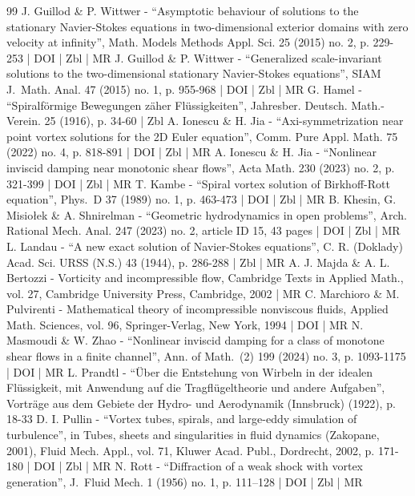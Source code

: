\begin{thebibliography}{99}
J. Guillod \& P. Wittwer - “Asymptotic behaviour of solutions to the stationary Navier-Stokes equations in two-dimensional exterior domains with zero velocity at infinity”, Math. Models Methods Appl. Sci. 25 (2015) no. 2, p. 229-253 | DOI | Zbl | MR
J. Guillod \& P. Wittwer - “Generalized scale-invariant solutions to the two-dimensional stationary Navier-Stokes equations”, SIAM J. Math. Anal. 47 (2015) no. 1, p. 955-968 | DOI | Zbl | MR
G. Hamel - “Spiralförmige Bewegungen zäher Flüssigkeiten”, Jahresber. Deutsch. Math.-Verein. 25 (1916), p. 34-60 | Zbl
A. Ionescu \& H. Jia - “Axi-symmetrization near point vortex solutions for the 2D Euler equation”, Comm. Pure Appl. Math. 75 (2022) no. 4, p. 818-891 | DOI | Zbl | MR
A. Ionescu \& H. Jia - “Nonlinear inviscid damping near monotonic shear flows”, Acta Math. 230 (2023) no. 2, p. 321-399 | DOI | Zbl | MR
T. Kambe - “Spiral vortex solution of Birkhoff-Rott equation”, Phys. D 37 (1989) no. 1, p. 463-473 | DOI | Zbl | MR
B. Khesin, G. Misiołek \& A. Shnirelman - “Geometric hydrodynamics in open problems”, Arch. Rational Mech. Anal. 247 (2023) no. 2, article ID 15, 43 pages | DOI | Zbl | MR
L. Landau - “A new exact solution of Navier-Stokes equations”, C. R. (Doklady) Acad. Sci. URSS (N.S.) 43 (1944), p. 286-288 | Zbl | MR
A. J. Majda \& A. L. Bertozzi - Vorticity and incompressible flow, Cambridge Texts in Applied Math., vol. 27, Cambridge University Press, Cambridge, 2002 | MR
C. Marchioro \& M. Pulvirenti - Mathematical theory of incompressible nonviscous fluids, Applied Math. Sciences, vol. 96, Springer-Verlag, New York, 1994 | DOI | MR
N. Masmoudi \& W. Zhao - “Nonlinear inviscid damping for a class of monotone shear flows in a finite channel”, Ann. of Math. (2) 199 (2024) no. 3, p. 1093-1175 | DOI | MR
L. Prandtl - “Über die Entstehung von Wirbeln in der idealen Flüssigkeit, mit Anwendung auf die Tragflügeltheorie und andere Aufgaben”, Vorträge aus dem Gebiete der Hydro- und Aerodynamik (Innsbruck) (1922), p. 18-33
D. I. Pullin - “Vortex tubes, spirals, and large-eddy simulation of turbulence”, in Tubes, sheets and singularities in fluid dynamics (Zakopane, 2001), Fluid Mech. Appl., vol. 71, Kluwer Acad. Publ., Dordrecht, 2002, p. 171-180 | DOI | Zbl | MR
N. Rott - “Diffraction of a weak shock with vortex generation”, J. Fluid Mech. 1 (1956) no. 1, p. 111–128 | DOI | Zbl | MR

\end{thebibliography}
